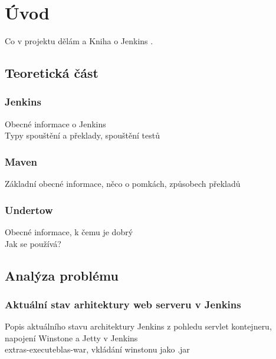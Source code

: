 



\chapter{Úvod}
    Co v projektu dělám a 
    Kniha o Jenkins \cite{JenkinsBook}.

\section{Teoretická část}
    \subsection {Jenkins}
        Obecné informace o Jenkins\\
        
        Typy spouštění a překlady, spouštění testů\\

    \subsection{Maven}
        Základní obecné informace, něco o pomkách, způsobech překladů\\

    \subsection{Undertow}
        Obecné informace, k čemu je dobrý\\

        Jak se používá?\\
        
\section{Analýza problému}
    
    \subsection{Aktuální stav arhitektury web serveru v Jenkins}
        Popis aktuálního stavu architektury Jenkins z pohledu servlet kontejneru, napojení Winstone a Jetty v Jenkins\\
        extras-executeblas-war, vkládání winstonu jako .jar\\

